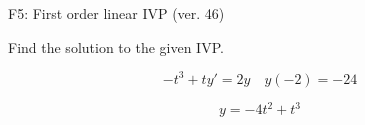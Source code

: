 \begin{exercise}
  \begin{exerciseTitle}F5: First order linear IVP (ver. 46)\end{exerciseTitle}
  \begin{exerciseStatement}
    
Find the solution to the given IVP.

    
\[-t^{3} +ty'= 2 y \hspace{1em} y( -2 ) = -24\]

  \end{exerciseStatement}
  \begin{exerciseAnswer}
    
\[y= -4 t^ 2 + t^{3}\]

  \end{exerciseAnswer}
\end{exercise}